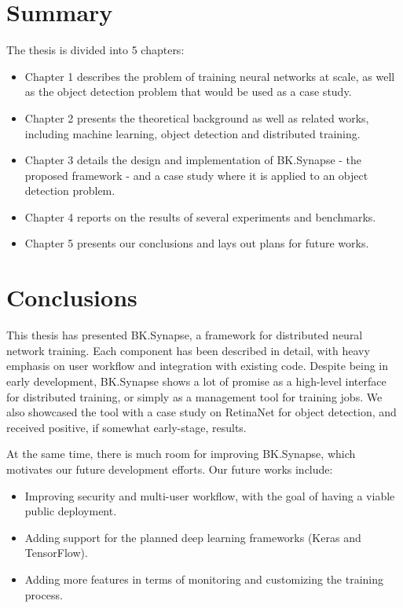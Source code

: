 \documentclass[a4paper, 12pt, oneside]{report}
\begin{document}
\chapter*{Summary}
The thesis is divided into 5 chapters:
\begin{itemize}
    \item Chapter 1 describes the problem of training neural networks at scale, as well as the object detection problem that would be used as a case study.
    \item Chapter 2 presents the theoretical background as well as related works, including machine learning, object detection and distributed training.
    \item Chapter 3 details the design and implementation of BK.Synapse - the proposed framework - and a case study where it is applied to an object detection problem.
    \item Chapter 4 reports on the results of several experiments and benchmarks.
    \item Chapter 5 presents our conclusions and lays out plans for future works.
\end{itemize}

\pagebreak
{}
\tableofcontents
\pagebreak
{}
\setcounter{page}{1}
\listoffigures
\listoftables

\printglossary[type=\acronymtype,style=long, title=List of Abbreviations]
\printglossary
\pagebreak



\pagebreak



\chapter{Conclusions}
This thesis has presented BK.Synapse, a framework for distributed neural network training. Each component has been described in detail, with heavy emphasis on user workflow and integration with existing code. Despite being in early development, BK.Synapse shows a lot of promise as a high-level interface for distributed training, or simply as a management tool for training jobs. We also showcased the tool with a case study on RetinaNet for object detection, and received positive, if somewhat early-stage, results.

At the same time, there is much room for improving BK.Synapse, which motivates our future development efforts. Our future works include:
\begin{itemize}
    \item Improving security and multi-user workflow, with the goal of having a viable public deployment.
    \item Adding support for the planned deep learning frameworks (Keras and TensorFlow).
    \item Adding more features in terms of monitoring and customizing the training process.
\end{itemize}

\pagebreak


\end{document}
